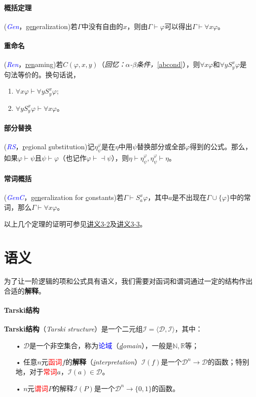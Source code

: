 \documentclass[b5paper,oneside]{ctexbook}
\newcommand{\Blue}[1]{\textcolor[named]{blue}{#1}}
\newcommand{\Red}[1]{\textcolor[named]{red}{#1}}
\begin{document}
\paragraph{概括定理}(\Blue{\textit{Gen}}，\underline{gen}eralization)若$\Gamma$中没有自由的$x$，则由$\Gamma\vdash\varphi$可以得出$\Gamma\vdash\forall x\varphi$。
\paragraph{重命名}(\Blue{\textit{Ren}}，\underline{ren}aming)若$C(\varphi,x,y)$（\textit{回忆：$\alpha$-$\beta$条件，}\ref{abcond}），则$\forall x\varphi$和$\forall yS_y^x\varphi$是句法等价的。换句话说，
\begin{enumerate}
\item $\forall x\varphi\vdash\forall yS_y^x\varphi$;
\item $\forall yS_y^x\varphi\vdash\forall x\varphi$。
\end{enumerate}
\paragraph{部分替换}(\Blue{\textit{RS}}，\underline{r}egional \underline{s}ubstitution)记$\eta_\psi^\varphi$是在$\eta$中用$\psi$替换部分或全部$\varphi$得到的公式。那么，如果$\varphi\vdash\psi$且$\psi\vdash\varphi$（也记作$\varphi\vdash\dashv\psi$），则$\eta\vdash\eta_\psi^\varphi,\eta_\psi^\varphi\vdash\eta$。
\paragraph{常词概括}(\Blue{\textit{GenC}}，\underline{gen}eralization for \underline{c}onstants)若$\Gamma\vdash S_a^x\varphi$，其中$a$是不出现在$\Gamma\cup\{\varphi\}$中的常词，那么$\Gamma\vdash\forall x\varphi$。

以上几个定理的证明可参见\href{http://iscasmc.ios.ac.cn/DM2016/annotated3-2.pdf}{讲义3-2}及\href{http://iscasmc.ios.ac.cn/DM2016/annotated3-3.pdf}{讲义3-3}。
\section{语义}
为了让一阶逻辑的项和公式具有语义，我们需要对函词和谓词通过一定的结构作出合适的\textbf{解释}。
\paragraph{Tarski结构}\textbf{Tarski结构}（\textit{Tarski structure}）是一个二元组$\mathscr{I}=\langle\mathcal{D},\mathcal{I}\rangle$，其中：
\begin{enumerate}
\item[•]$\mathcal{D}$是一个非空集合，称为\Blue{论域}（\textit{\underline{d}omain}），一般是$\mathbb{N},\mathbb{R}$等；
\item[•]任意$n$元\Red{函词}$f$的\textbf{解释}（\textit{\underline{i}nterpretation}）$\mathcal{I}(f)$是一个$\mathcal{D}^n\to\mathcal{D}$的函数；特别地，对于\Red{常词}$a$，$\mathcal{I}(a)\in\mathcal{D}$。
\item[•]$n$元\Red{谓词}$P$的解释$\mathcal{I}(P)$是一个$\mathcal{D}^n\to\{0,1\}$的函数。
\end{enumerate}
\end{document}
